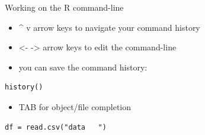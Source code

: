 \documentclass[
  ignorenonframetext,
]{beamer}
\providecommand{\tightlist}{%
  \setlength{\itemsep}{0pt}\setlength{\parskip}{0pt}}
\begin{document}
\begin{frame}[fragile]{Working on the R command-line}
\protect\hypertarget{working-on-the-r-command-line}{}
\begin{itemize}
\tightlist
\item
  \^{} v arrow keys to navigate your command history
\item
  \textless- -\textgreater{} arrow keys to edit the command-line
\item
  you can save the command history:
\end{itemize}

\begin{verbatim}
history()
\end{verbatim}

\begin{itemize}
\tightlist
\item
  TAB for object/file completion
\end{itemize}

\begin{verbatim}
df = read.csv("data   ")
\end{verbatim}
\end{frame}
\end{document}
